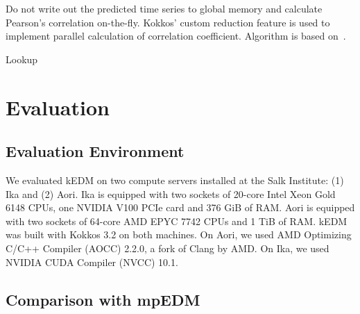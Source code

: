 \documentclass[conference]{IEEEtran}
\begin{document}
Do not write out the predicted time series to global memory and calculate
Pearson’s correlation on-the-fly. Kokkos’ custom reduction feature is used to
implement parallel calculation of correlation coefficient. Algorithm is
based on~\cite{Schubert2018}.

\begin{algorithm}
    \SetAlgoLined
    \DontPrintSemicolon
     
    \caption{Lookup}%
    \label{alg:lookup}
\end{algorithm}

\section{Evaluation}\label{sec:evaluation}

\subsection{Evaluation Environment}


We evaluated kEDM on two compute servers installed at the Salk Institute: (1)
Ika and (2) Aori. Ika is equipped with two sockets of 20-core Intel Xeon Gold
6148 CPUs, one NVIDIA V100 PCIe card and 376 GiB of RAM\@. Aori is equipped with
two sockets of 64-core AMD EPYC 7742 CPUs and 1 TiB of RAM\@. kEDM was built
with Kokkos 3.2 on both machines. On Aori, we used AMD Optimizing C/C++ Compiler
(AOCC) 2.2.0, a fork of Clang by AMD. On Ika, we used NVIDIA CUDA Compiler (NVCC)
10.1.

\subsection{Comparison with mpEDM}
\end{document}
